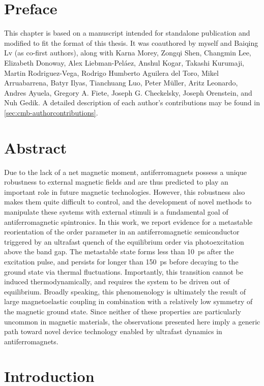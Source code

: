 \section{Preface}

This chapter is based on a manuscript intended for standalone publication and modified to fit the format of this thesis.
It was coauthored by myself and Baiqing Lv (as co-first authors), along with Karna Morey, Zongqi Shen, Changmin Lee, Elizabeth Donoway, Alex Liebman-Pel\'{a}ez, Anshul Kogar, Takashi Kurumaji, Martin Rodriguez-Vega, Rodrigo Humberto Aguilera del Toro, Mikel Arruabarrena, Batyr Ilyas, Tianchuang Luo, Peter M\"{u}ller, Aritz Leonardo, Andres Ayuela, Gregory A. Fiete, Joseph G. Checkelsky, Joseph Orenstein, and Nuh Gedik.
A detailed description of each author's contributions may be found in \cref{sec:cmb-authorcontributions}.

\section{Abstract}

Due to the lack of a net magnetic moment, antiferromagnets possess a unique robustness to external magnetic fields and are thus predicted to play an important role in future magnetic technologies.
However, this robustness also makes them quite difficult to control, and the development of novel methods to manipulate these systems with external stimuli is a fundamental goal of antiferromagnetic spintronics.
In this work, we report evidence for a metastable reorientation of the order parameter in an antiferromagnetic semiconductor triggered by an ultrafast quench of the equilibrium order via photoexcitation above the band gap.
The metastable state forms less than \qty{10}{ps} after the excitation pulse, and persists for longer than \qty{150}{ps} before decaying to the ground state via thermal fluctuations.
Importantly, this transition cannot be induced thermodynamically, and requires the system to be driven out of equilibrium.
Broadly speaking, this phenomenology is ultimately the result of large magnetoelastic coupling in combination with a relatively low symmetry of the magnetic ground state.
Since neither of these properties are particularly uncommon in magnetic materials, the observations presented here imply a generic path toward novel device technology enabled by ultrafast dynamics in antiferromagnets.

\section{Introduction}

